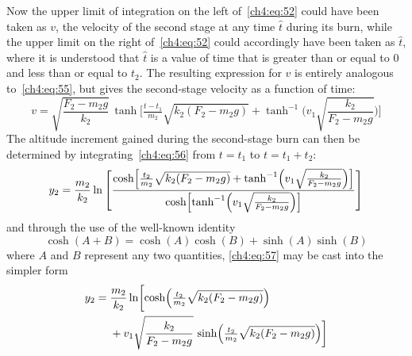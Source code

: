 Now the upper limit of integration on the left of~\eqref{ch4:eq:52} could have been taken as $v$,
the velocity of the second stage at any time $\hat{t}$ during its burn, while the upper limit on the
right of~\eqref{ch4:eq:52} could accordingly have been taken as $\hat{t}$, where it is understood
that $\hat{t}$ is a value of time that is greater than or equal to 0 and less than or equal to
$t_2$. The
resulting expression for $v$ is entirely analogous to~\eqref{ch4:eq:55}, but gives
the second-stage velocity as a function of time:
\begin{equation}\label{ch4:eq:56}
v = \sqrt{\frac{F_2 - m_2g}{k_2}}\,\tanh\biggl[\tfrac{t - t_1}{m_2}\sqrt{k_2(F_2 - m_2g)}
  + \tanh^{-1}\biggl(v_1\sqrt{\frac{k_2}{F_2 - m_2g}}\biggr)\biggr]
\end{equation}
The altitude increment gained during the second-stage burn can then be determined by
integrating~\eqref{ch4:eq:56} from $t = t_1$ to $t = t_1 + t_2$:
\begin{equation}\label{ch4:eq:57}
y_2 = \frac{m_2}{k_2}\ln\left[\frac{\cosh\Bigl[\tfrac{t_2}{m_2}\sqrt{k_2(F_2 - m_2g)}
  + \tanh^{-1}\Bigl(v_1\sqrt{\frac{k_2}{F_2 - m_2g}}\Bigr)\Bigr]}{\cosh\Bigl[\tanh^{-1}\Bigl(v_1
  \sqrt{\frac{k_2}{F_2 - m_2g}}\Bigr)\Bigr]}\right]
\end{equation}
and through the use of the well-known identity
\begin{equation*}
\cosh(A + B) = \cosh(A)\cosh(B) + \sinh(A)\sinh(B)
\end{equation*}
where $A$ and $B$ represent any two quantities, \eqref{ch4:eq:57} may be cast into the simpler form
\begin{equation}\label{ch4:eq:58}
\begin{split}
y_2 = {}&\frac{m_2}{k_2}\ln\biggl[\cosh\Bigl(\tfrac{t_2}{m_2}\sqrt{k_2(F_2 - m_2g)}\Bigr)\\
&+ v_1\sqrt{\frac{k_2}{F_2 - m_2g}}\,\sinh\Bigl(\tfrac{t_2}{m_2}\sqrt{k_2(F_2 - m_2g)}\Bigr)\biggr]
\end{split}
\end{equation}

